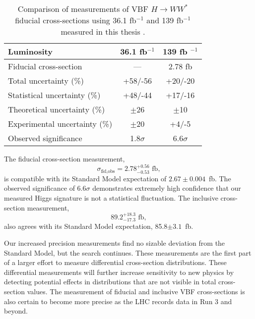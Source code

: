 \begin{table}[!h]
  \begin{center}
    \begin{tabular}{|l|c|c|}
       \hline
        Luminosity & 36.1 fb$^{-1}$    & 139 fb $^{-1}$ \\
      \hline
	Fiducial cross-section & --- & 2.78 fb \\ 
	Total uncertainty (\%) & +58/-56 & +20/-20 \\
	Statistical uncertainty (\%) & +48/-44 & +17/-16 \\
        Theoretical uncertainty (\%) & $\pm$26 & $\pm$10 \\
        Experimental uncertainty (\%) & $\pm$20 & +4/-5 \\
        Observed significance & 1.8$\sigma$& 6.6$\sigma$ \\
	\hline 
    \end{tabular}
    \caption{Comparison of measurements of VBF $H\rightarrow WW^*$ fiducial cross-sections using 36.1 fb$^{-1}$ and 139 fb$^{-1}$ measured in this thesis \cite{HWW2016}.}
    \label{tab:comparison}
  \end{center}
\end{table}

The fiducial cross-section measurement, 
\begin{equation}
\sigma_{\text{fid,obs}} = 2.78^{+0.56}_{-0.53} \text{ fb},
\end{equation}
is compatible with its Standard Model expectation of $2.67\pm0.004$~fb. The observed significance of $6.6\sigma$ demonstrates extremely high confidence that our measured Higgs signature is not a statistical fluctuation. The inclusive cross-section measurement,
\begin{equation}
89.2^{+18.3}_{-17.3} \text{ fb},
\end{equation}
also agrees with its Standard Model expectation, 85.8$\pm 3.1$~fb. 

Our increased precision measurements find no sizable deviation from the Standard Model, but the search continues. These measurements are the first part of a larger effort to measure differential cross-section distributions. These differential measurements will further increase sensitivity to new physics by detecting potential effects in distributions that are not visible in total cross-section values. The measurement of fiducial and inclusive VBF cross-sections is also certain to become more precise as the LHC records data in Run 3 and beyond. 
